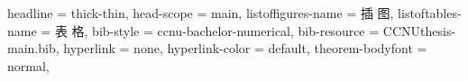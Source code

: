 {{      %
    headline = thick-thin,
    head-scope = main,
    listoffigures-name = {插 \quad 图},
    listoftables-name  = {表 \quad 格},
    bib-style = ccnu-bachelor-numerical,
    bib-resource = {CCNUthesis-main.bib},
    hyperlink = none,
    hyperlink-color = default,
    theorem-bodyfont = normal,
  }
}


